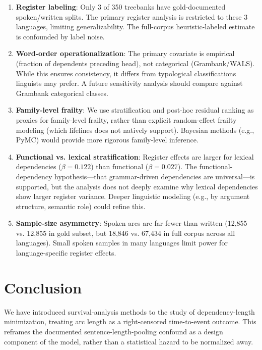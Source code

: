 \documentclass[11pt,letterpaper]{article}
\begin{document}
\begin{enumerate}
\item \textbf{Register labeling}: Only 3 of 350 treebanks have gold-documented spoken/written splits. The primary register analysis is restricted to these 3 languages, limiting generalizability. The full-corpus heuristic-labeled estimate is confounded by label noise.

\item \textbf{Word-order operationalization}: The primary covariate is empirical (fraction of dependents preceding head), not categorical (Grambank/WALS). While this ensures consistency, it differs from typological classifications linguists may prefer. A future sensitivity analysis should compare against Grambank categorical classes.

\item \textbf{Family-level frailty}: We use stratification and post-hoc residual ranking as proxies for family-level frailty, rather than explicit random-effect frailty modeling (which lifelines does not natively support). Bayesian methods (e.g., PyMC) would provide more rigorous family-level inference.

\item \textbf{Functional vs. lexical stratification}: Register effects are larger for lexical dependencies ($\beta=0.122$) than functional ($\beta=0.027$). The functional-dependency hypothesis---that grammar-driven dependencies are universal---is supported, but the analysis does not deeply examine why lexical dependencies show larger register variance. Deeper linguistic modeling (e.g., by argument structure, semantic role) could refine this.

\item \textbf{Sample-size asymmetry}: Spoken arcs are far fewer than written (12,855 vs. 12,855 in gold subset, but 18,846 vs. 67,434 in full corpus across all languages). Small spoken samples in many languages limit power for language-specific register effects.
\end{enumerate}

\section{Conclusion}

We have introduced survival-analysis methods to the study of dependency-length minimization, treating arc length as a right-censored time-to-event outcome. This reframes the documented sentence-length-pooling confound as a design component of the model, rather than a statistical hazard to be normalized away.
\end{document}

